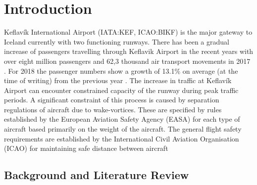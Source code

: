 \chapter{Introduction\label{cha:introduction}}

Keflavík International Airport (IATA:KEF, ICAO:BIKF) is the major gateway to Iceland currently with two functioning runways. 
There has been a gradual increase of passengers travelling through Keflavik Airport in the recent years with over eight million passengers and 62,3 thousand air transport movements in 2017 \cite{isavia_facts_2017}. For 2018 the passenger numbers show a growth of 13.1\% on average (at the time of writing) from the previous year \cite{isavia_pass_statistics_2018}. The increase in traffic at Keflavík Airport can encounter constrained capacity of the runway during peak traffic periods. 
A significant constraint of this process is caused by separation regulations of aircraft due to wake-vortices. These are specified by rules established by the European Aviation Safety Agency (EASA)  for each type of aircraft based primarily on the weight of the aircraft. The general flight safety requirements are established by the International Civil Aviation Organisation (ICAO) for maintaining safe distance between aircraft

\section{Background and Literature Review}



